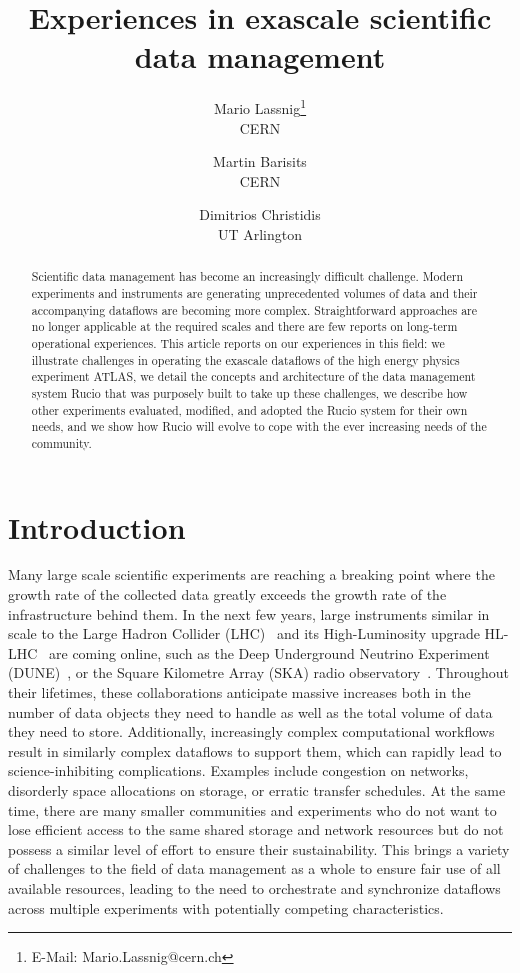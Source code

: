 \documentclass[11pt]{article}
\begin{document}
\title{Experiences in exascale scientific data management}

\author{
Mario Lassnig\thanks{E-Mail: Mario.Lassnig@cern.ch}\\CERN \and
Martin Barisits\\CERN \and
Dimitrios Christidis\\UT Arlington
}

\maketitle

\begin{abstract}
Scientific data management has become an increasingly difficult challenge. Modern experiments and instruments are generating unprecedented volumes of data and their accompanying dataflows are becoming more complex. Straightforward approaches are no longer applicable at the required scales and there are few reports on long-term operational experiences. This article reports on our experiences in this field: we illustrate challenges in operating the exascale dataflows of the high energy physics experiment ATLAS, we detail the concepts and architecture of the data management system Rucio that was purposely built to take up these challenges, we describe how other experiments evaluated, modified, and adopted the Rucio system for their own needs, and we show how Rucio will evolve to cope with the ever increasing needs of the community.
\end{abstract}

\section{Introduction}

Many large scale scientific experiments are reaching a breaking point where the growth rate of the collected data greatly exceeds the growth rate of the infrastructure behind them. In the next few years, large instruments similar in scale to the Large Hadron Collider (LHC)~\cite{lhc} and its High-Luminosity upgrade HL-LHC~\cite{hllhc} are coming online, such as the Deep Underground Neutrino Experiment (DUNE)~\cite{dune}, or the Square Kilometre Array (SKA) radio observatory~\cite{ska}. Throughout their lifetimes, these collaborations anticipate massive increases both in the number of data objects they need to handle as well as the total volume of data they need to store. Additionally, increasingly complex computational workflows result in similarly complex dataflows to support them, which can rapidly lead to science-inhibiting complications. Examples include congestion on networks, disorderly space allocations on storage, or erratic transfer schedules. At the same time, there are many smaller communities and experiments who do not want to lose efficient access to the same shared storage and network resources but do not possess a similar level of effort to ensure their sustainability. This brings a variety of challenges to the field of data management as a whole to ensure fair use of all available resources, leading to the need to orchestrate and synchronize dataflows across multiple experiments with potentially competing characteristics.
\end{document}
